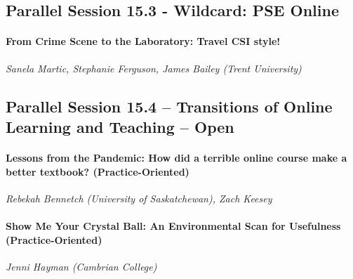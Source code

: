 \documentclass[
]{book}
\begin{document}
\hypertarget{parallel-session-15.3---wildcard-pse-online}{%
\subsection*{Parallel Session 15.3 - Wildcard: PSE Online}\label{parallel-session-15.3---wildcard-pse-online}}

\begin{secondary}
\hypertarget{from-crime-scene-to-the-laboratory-travel-csi-style}{%
\paragraph{From Crime Scene to the Laboratory: Travel CSI
style!}\label{from-crime-scene-to-the-laboratory-travel-csi-style}}

\emph{Sanela Martic, Stephanie Ferguson, James Bailey (Trent
University)}
\end{secondary}

\hypertarget{parallel-session-15.4-transitions-of-online-learning-and-teaching-open}{%
\subsection*{Parallel Session 15.4 -- Transitions of Online Learning and Teaching -- Open}\label{parallel-session-15.4-transitions-of-online-learning-and-teaching-open}}

\begin{secondary}
\hypertarget{lessons-from-the-pandemic-how-did-a-terrible-online-course-make-a-better-textbook-practice-oriented}{%
\paragraph{Lessons from the Pandemic: How did a terrible online course
make a better textbook?
(Practice-Oriented)}\label{lessons-from-the-pandemic-how-did-a-terrible-online-course-make-a-better-textbook-practice-oriented}}

\emph{Rebekah Bennetch (University of Saskatchewan), Zach Keesey}
\end{secondary}

\begin{secondary}
\hypertarget{show-me-your-crystal-ball-an-environmental-scan-for-usefulness-practice-oriented}{%
\paragraph{Show Me Your Crystal Ball: An Environmental Scan for
Usefulness
(Practice-Oriented)}\label{show-me-your-crystal-ball-an-environmental-scan-for-usefulness-practice-oriented}}

\emph{Jenni Hayman (Cambrian College)}
\end{secondary}
\end{document}
